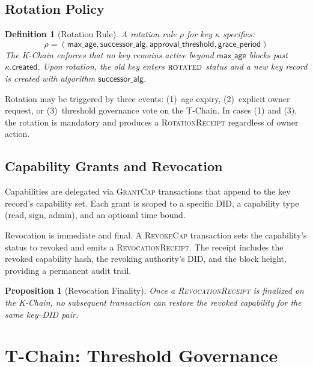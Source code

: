 \documentclass[11pt,a4paper]{article}
\newtheorem{proposition}[theorem]{Proposition}
\newtheorem{definition}{Definition}[section]
\begin{document}
\subsection{Rotation Policy}

\begin{definition}[Rotation Rule]\label{def:rotation}
A rotation rule $\rho$ for key $\kappa$ specifies:
\[
    \rho = (\mathsf{max\_age}, \mathsf{successor\_alg}, \mathsf{approval\_threshold},
            \mathsf{grace\_period})
\]
The K-Chain enforces that no key remains active beyond $\mathsf{max\_age}$ blocks
past $\kappa.\mathsf{created}$. Upon rotation, the old key enters
$\textsc{rotated}$ status and a new key record is created with algorithm
$\mathsf{successor\_alg}$.
\end{definition}

Rotation may be triggered by three events: (1)~age expiry, (2)~explicit owner request,
or (3)~threshold governance vote on the T-Chain. In cases (1) and (3), the rotation
is mandatory and produces a \textsc{RotationReceipt} regardless of owner action.

\subsection{Capability Grants and Revocation}

Capabilities are delegated via \textsc{GrantCap} transactions that append to the
key record's capability set. Each grant is scoped to a specific DID, a capability
type (read, sign, admin), and an optional time bound.

Revocation is immediate and final. A \textsc{RevokeCap} transaction sets the
capability's status to revoked and emits a \textsc{RevocationReceipt}. The receipt
includes the revoked capability hash, the revoking authority's DID, and the block
height, providing a permanent audit trail.

\begin{proposition}[Revocation Finality]\label{prop:revocation}
Once a \textsc{RevocationReceipt} is finalized on the K-Chain, no subsequent
transaction can restore the revoked capability for the same key--DID pair.
\end{proposition}

\section{T-Chain: Threshold Governance}\label{sec:tchain}
\end{document}
